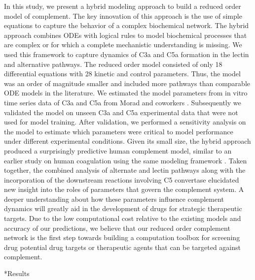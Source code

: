 \documentclass[12pt]{article}
\makeatletter
\renewcommand\section{\@startsection
	{subsection}{2}{0mm}
	{-0.2in}
	{0.05\baselineskip}
	{\normalfont\large\bfseries}}
\makeatother
\begin{document}
In this study, we present a hybrid modeling approach to build a reduced order model of complement. The key innovation of this approach is the use of simple equations to capture the behavior of a complex biochemical network. The hybrid approach combines ODEs with logical rules to model biochemical processes that are complex or for which a complete mechanistic understanding is missing. We used this framework to capture dynamics of C3a and C5a formation in the lectin and alternative pathways. The reduced order model consisted of only 18 differential equations with 28 kinetic and control parameters. Thus, the model was an order  of magnitude smaller and included more pathways than comparable ODE models in the literature. We estimated the model parameters from in vitro time series data of C3a and C5a from Morad and coworkers \cite{morad2015time}. Subsequently we validated the model on unseen C3a and C5a experimental data that were not used for model training.  After validation, we performed a sensitivity analysis on the model to estimate which parameters were critical to model performance under different experimental conditions. Given its small size, the hybrid approach produced a surprisingly predictive human complement model, similar to an earlier study on human coagulation using the same modeling framework \cite{sagar2015dynamic}. Taken together, the combined analysis of alternate and lectin pathways along with the incorporation of the downstream reactions involving C5 convertase elucidated new insight into the roles of parameters that govern the complement system.  A deeper understanding about how these parameters influence complement dynamics will greatly aid in the development of drugs for strategic therapeutic targets. Due to the low computational cost relative to the existing models and accuracy of our predictions, we believe that our reduced order complement network is the first step towards building a computation toolbox for screening drug potential drug targets or therapeutic agents that can be targeted against complement.
\clearpage

\section*{Results}
\end{document}
